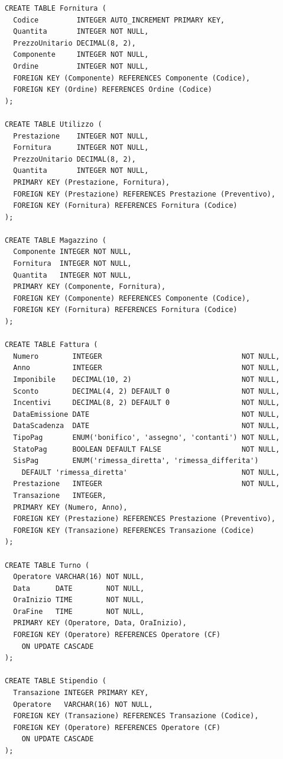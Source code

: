 \begin{lstlisting}
CREATE TABLE Fornitura (
  Codice         INTEGER AUTO_INCREMENT PRIMARY KEY,
  Quantita       INTEGER NOT NULL,
  PrezzoUnitario DECIMAL(8, 2),
  Componente     INTEGER NOT NULL,
  Ordine         INTEGER NOT NULL,
  FOREIGN KEY (Componente) REFERENCES Componente (Codice),
  FOREIGN KEY (Ordine) REFERENCES Ordine (Codice)
);

CREATE TABLE Utilizzo (
  Prestazione    INTEGER NOT NULL,
  Fornitura      INTEGER NOT NULL,
  PrezzoUnitario DECIMAL(8, 2),
  Quantita       INTEGER NOT NULL,
  PRIMARY KEY (Prestazione, Fornitura),
  FOREIGN KEY (Prestazione) REFERENCES Prestazione (Preventivo),
  FOREIGN KEY (Fornitura) REFERENCES Fornitura (Codice)
);

CREATE TABLE Magazzino (
  Componente INTEGER NOT NULL,
  Fornitura  INTEGER NOT NULL,
  Quantita   INTEGER NOT NULL,
  PRIMARY KEY (Componente, Fornitura),
  FOREIGN KEY (Componente) REFERENCES Componente (Codice),
  FOREIGN KEY (Fornitura) REFERENCES Fornitura (Codice)
);

CREATE TABLE Fattura (
  Numero        INTEGER                                 NOT NULL,
  Anno          INTEGER                                 NOT NULL,
  Imponibile    DECIMAL(10, 2)                          NOT NULL,
  Sconto        DECIMAL(4, 2) DEFAULT 0                 NOT NULL,
  Incentivi     DECIMAL(8, 2) DEFAULT 0                 NOT NULL,
  DataEmissione DATE                                    NOT NULL,
  DataScadenza  DATE                                    NOT NULL,
  TipoPag       ENUM('bonifico', 'assegno', 'contanti') NOT NULL,
  StatoPag      BOOLEAN DEFAULT FALSE                   NOT NULL,
  SisPag        ENUM('rimessa_diretta', 'rimessa_differita')
    DEFAULT 'rimessa_diretta'                           NOT NULL,
  Prestazione   INTEGER                                 NOT NULL,
  Transazione   INTEGER,
  PRIMARY KEY (Numero, Anno),
  FOREIGN KEY (Prestazione) REFERENCES Prestazione (Preventivo),
  FOREIGN KEY (Transazione) REFERENCES Transazione (Codice)
);

CREATE TABLE Turno (
  Operatore VARCHAR(16) NOT NULL,
  Data      DATE        NOT NULL,
  OraInizio TIME        NOT NULL,
  OraFine   TIME        NOT NULL,
  PRIMARY KEY (Operatore, Data, OraInizio),
  FOREIGN KEY (Operatore) REFERENCES Operatore (CF)
    ON UPDATE CASCADE
);

CREATE TABLE Stipendio (
  Transazione INTEGER PRIMARY KEY,
  Operatore   VARCHAR(16) NOT NULL,
  FOREIGN KEY (Transazione) REFERENCES Transazione (Codice),
  FOREIGN KEY (Operatore) REFERENCES Operatore (CF)
    ON UPDATE CASCADE
);


\end{lstlisting}
